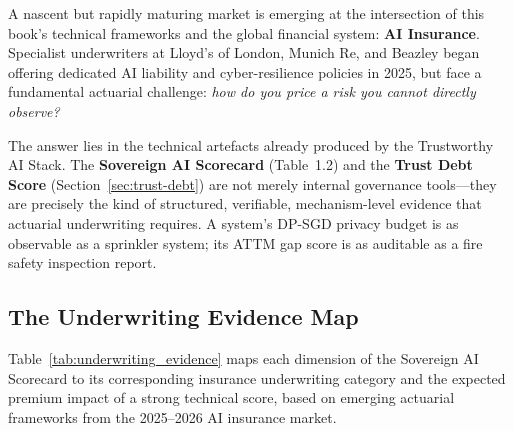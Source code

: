 A nascent but rapidly maturing market is emerging at the intersection of this book's technical frameworks and the global financial system: \textbf{AI Insurance}. Specialist underwriters at Lloyd's of London, Munich Re, and Beazley began offering dedicated AI liability and cyber-resilience policies in 2025, but face a fundamental actuarial challenge: \emph{how do you price a risk you cannot directly observe?}

The answer lies in the technical artefacts already produced by the Trustworthy AI Stack. The \textbf{Sovereign AI Scorecard} (Table~1.2) and the \textbf{Trust Debt Score} (Section~\ref{sec:trust-debt}) are not merely internal governance tools---they are precisely the kind of structured, verifiable, mechanism-level evidence that actuarial underwriting requires. A system's DP-SGD privacy budget is as observable as a sprinkler system; its ATTM gap score is as auditable as a fire safety inspection report.

\subsection{The Underwriting Evidence Map}
\label{sec:underwriting_map}

Table~\ref{tab:underwriting_evidence} maps each dimension of the Sovereign AI Scorecard to its corresponding insurance underwriting category and the expected premium impact of a strong technical score, based on emerging actuarial frameworks from the 2025--2026 AI insurance market.

